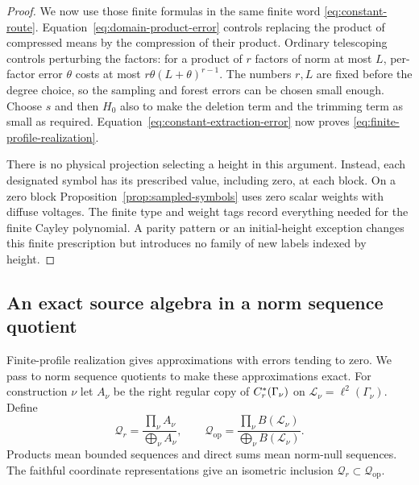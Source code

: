 \begin{proof}
We now use those finite formulas in the same finite word
\eqref{eq:constant-route}.  Equation~\eqref{eq:domain-product-error}
controls replacing the product of compressed means by the compression of
their product.  Ordinary telescoping controls perturbing the factors: for
a product of $r$ factors of norm at most $L$, per-factor error $\theta$
costs at most $r\theta(L+\theta)^{r-1}$.  The numbers $r,L$ are fixed before
the degree choice, so the sampling and forest errors can be chosen small
enough.  Choose $s$ and then $H_0$ also to make the deletion term and the
trimming term as small as required.  Equation~\eqref{eq:constant-extraction-error}
now proves \eqref{eq:finite-profile-realization}.

There is no physical projection selecting a height in this argument.
Instead, each designated symbol has its prescribed value, including zero,
at each block.  On a zero block Proposition~\ref{prop:sampled-symbols}
uses zero scalar weights with diffuse voltages.  The finite type and weight
tags record everything needed for the finite Cayley polynomial.  A parity
pattern or an initial-height exception changes this finite prescription but
introduces no family of new labels indexed by height.
\end{proof}

\subsection{An exact source algebra in a norm sequence quotient}

Finite-profile realization gives approximations with errors tending to zero.
We pass to norm sequence quotients to make these approximations exact.
For construction $\nu$ let $A_\nu$ be the right regular copy of
$C_r^*(\Gamma_\nu)$ on $\mathscr L_\nu=\ell^2(\Gamma_\nu)$.  Define
\[
 \mathcal Q_r=\frac{\prod_\nu A_\nu}{\bigoplus_\nu A_\nu},
 \qquad
 \mathcal Q_{\mathrm{op}}
 =\frac{\prod_\nu B(\mathscr L_\nu)}{\bigoplus_\nu B(\mathscr L_\nu)}.
\]
Products mean bounded sequences and direct sums mean norm-null sequences.
The faithful coordinate representations give an isometric inclusion
$\mathcal Q_r\subset\mathcal Q_{\mathrm{op}}$.


